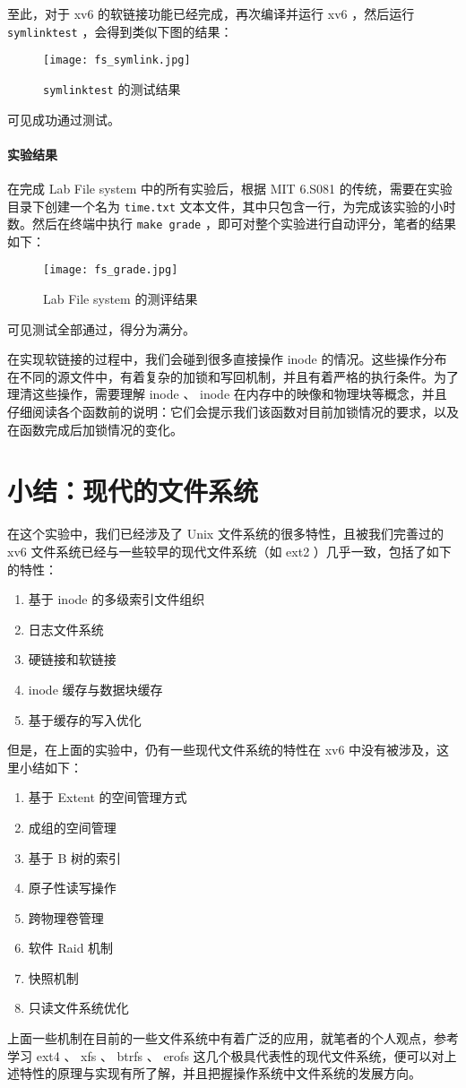 至此，对于 xv6 的软链接功能已经完成，再次编译并运行 xv6 ，然后运行 \lstinline{symlinktest} ，会得到类似下图的结果：
\begin{figure}[H]
  \centering
  \texttt{[image: fs\_symlink.jpg]}
  \caption{ \lstinline{symlinktest} 的测试结果}
\end{figure}

可见成功通过测试。

\paragraph*{实验结果} 在完成 Lab File system 中的所有实验后，根据 MIT 6.S081 的传统，需要在实验目录下创建一个名为 \lstinline{time.txt} 文本文件，其中只包含一行，为完成该实验的小时数。然后在终端中执行 \lstinline{make grade} ，即可对整个实验进行自动评分，笔者的结果如下：
\begin{figure}[H]
  \centering
  \texttt{[image: fs\_grade.jpg]}
  \caption{ Lab File system 的测评结果}
\end{figure}

可见测试全部通过，得分为满分。

\begin{theorem}
    在实现软链接的过程中，我们会碰到很多直接操作 inode 的情况。这些操作分布在不同的源文件中，有着复杂的加锁和写回机制，并且有着严格的执行条件。为了理清这些操作，需要理解 inode 、 inode 在内存中的映像和物理块等概念，并且仔细阅读各个函数前的说明：它们会提示我们该函数对目前加锁情况的要求，以及在函数完成后加锁情况的变化。
\end{theorem}
\section{小结：现代的文件系统}

在这个实验中，我们已经涉及了 Unix 文件系统的很多特性，且被我们完善过的 xv6 文件系统已经与一些较早的现代文件系统（如 ext2 ）几乎一致，包括了如下的特性：
\begin{enumerate}
    \item 基于 inode 的多级索引文件组织
    \item 日志文件系统
    \item 硬链接和软链接
    \item inode 缓存与数据块缓存
    \item 基于缓存的写入优化
\end{enumerate}

但是，在上面的实验中，仍有一些现代文件系统的特性在 xv6 中没有被涉及，这里小结如下：
\begin{enumerate}
    \item 基于 Extent 的空间管理方式
    \item 成组的空间管理
    \item 基于 B 树的索引
    \item 原子性读写操作
    \item 跨物理卷管理
    \item 软件 Raid 机制
    \item 快照机制
    \item 只读文件系统优化
\end{enumerate}

上面一些机制在目前的一些文件系统中有着广泛的应用，就笔者的个人观点，参考学习 ext4 、 xfs 、 btrfs 、 erofs 这几个极具代表性的现代文件系统，便可以对上述特性的原理与实现有所了解，并且把握操作系统中文件系统的发展方向。